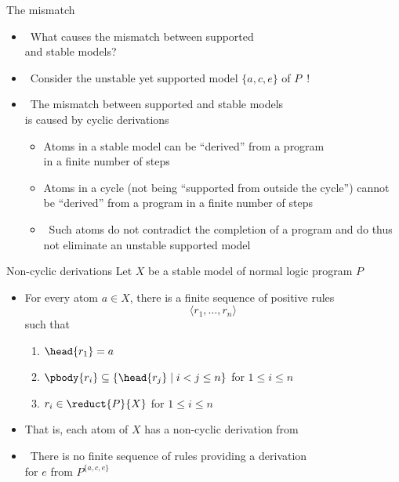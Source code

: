 \begin{frame}{The mismatch}
  \begin{itemize}
  \item<1->  \
    What causes the mismatch between supported\\ and stable models?
      \smallskip
  \item<2->[] \itarrow\
    Consider the unstable yet supported model $\{a,c,e\}$ of $P$~!
    \medskip
  \item<3-> \structure{Answer} \
    The mismatch between supported and stable models\\ is caused by cyclic derivations
      \smallskip
    \begin{itemize}\normalsize
    \item<4-> Atoms in a stable model can be ``derived'' from a program\\ in a finite number of steps
      \smallskip
    \item<5-> Atoms in a cycle (not being ``supported from outside the cycle'') cannot be ``derived''
      from a program in a finite number of steps
      \medskip
    \item<6-> \structure{Note} \
      Such atoms do not contradict the completion of a program and
      do thus not eliminate an unstable supported model
    \end{itemize}
  \end{itemize}
\end{frame}
\begin{frame}{Non-cyclic derivations}
  \medskip
  Let $X$ be a stable model of normal logic program $P$
  \medskip
  \begin{itemize}
  \item For every atom $a\in X$,
    there is a finite sequence of positive rules
    \[
    \langle r_1,\dots,r_n\rangle
    \]
    such that
    \begin{enumerate}\normalsize
    \item $\head{r_1}=a$
    \item $\pbody{r_i}\subseteq\{\head{r_j} \mid i<j\leq n\}$      \hfill for $1\leq i\leq n\qquad$
    \item $r_i\in{}$                                 \hfill for $1\leq i\leq n\qquad$
    \end{enumerate}
    \smallskip
  \item <2-> That is,
    each atom of $X$ has a non-cyclic derivation from \reduct{P}{X}
    \medskip
  \item<3->  \
    There is no finite sequence of rules providing a derivation\\ for $e$ from $P^{\{a,c,e\}}$
  \end{itemize}
\end{frame}
